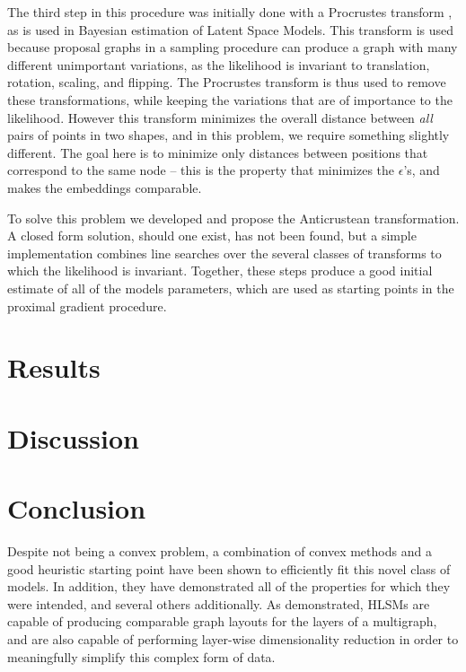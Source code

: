 \documentclass{article}
\begin{document}
The third step in this procedure was initially done with a Procrustes transform \cite{Hoff2002}, as is used in Bayesian estimation of Latent Space Models. This transform is used because proposal graphs in a sampling procedure can produce a graph with many different unimportant variations, as the likelihood is invariant to translation, rotation, scaling, and flipping. The Procrustes transform is thus used to remove these transformations, while keeping the variations that are of importance to the likelihood. However this transform minimizes the overall distance between \textit{all} pairs of points in two shapes, and in this problem, we require something slightly different. The goal here is to minimize only distances between positions that correspond to the same node -- this is the property that minimizes the $\epsilon$'s, and makes the embeddings comparable.

To solve this problem we developed and propose the Anticrustean transformation. A closed form solution, should one exist, has not been found, but a simple implementation combines line searches over the several classes of transforms to which the likelihood is invariant. Together, these steps produce a good initial estimate of all of the models parameters, which are used as starting points in the proximal gradient procedure. 




\section{Results}

\lipsum[4]


\section{Discussion}




\section{Conclusion}

Despite not being a convex problem, a combination of convex methods and a good heuristic starting point have been shown to efficiently fit this novel class of models. In addition, they have demonstrated all of the properties for which they were intended, and several others additionally. As demonstrated, HLSMs are capable of producing comparable graph layouts for the layers of a multigraph, and are also capable of performing layer-wise dimensionality reduction in order to meaningfully simplify this complex form of data.
\end{document}

